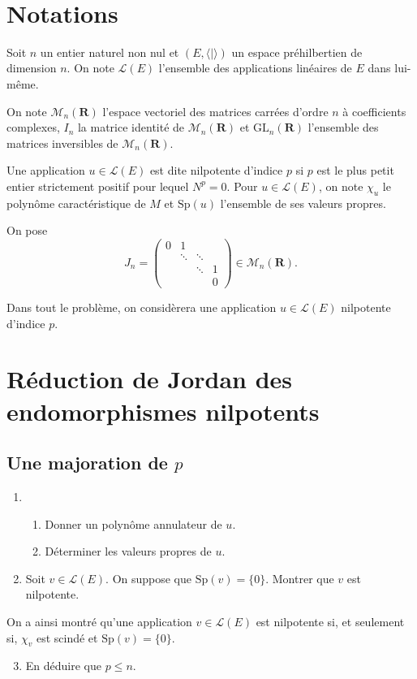 \documentclass[a4paper,11pt]{article}
\newcommand{\R}{\mathbf{R}}
\newcommand{\M}{\mathcal{M}}
\renewcommand{\L}{\mathcal{L}}
\newcommand{\titre}[1]{
		\colorbox{vert1}{
		\parbox{\headwidth}{
			\center{\Large{\sffamily\bfseries{\color{gris}{#1}}}}\\
			\vspace*{1em}
		}}
	}
\begin{document}
\thispagestyle{empty}	%
\pagecolor{gris}			%
\titre{Autour des endomorphismes nilpotents}
\vspace*{1em}
\section*{Notations}
Soit $n$ un entier naturel non nul et $(E,\langle\vert\rangle)$ un espace préhilbertien de dimension $n$. On note $\L(E)$ l'ensemble des applications linéaires de $E$ dans lui-même.

On note $\M_n(\R)$ l'espace vectoriel des matrices carrées d'ordre $n$ à coefficients complexes, $I_n$ la matrice identité de $\M_n(\R)$ et $\mathrm{GL}_n(\R)$ l'ensemble des matrices inversibles de $\M_n(\R)$.

Une application $u\in\L(E)$ est dite nilpotente d'indice $p$ si $p$ est le plus petit entier strictement positif pour lequel $N^p=0$. Pour $u\in\L(E)$, on note $\chi_u$ le polynôme caractéristique de $M$ et $\mathrm{Sp}(u)$ l'ensemble de ses valeurs propres.

On pose \[J_n=\begin{pmatrix}
0&1&&\\
&\ddots&\ddots&\\
&&\ddots&1\\
&&&0

\end{pmatrix}\in\M_n(\R).\]

Dans tout le problème, on considèrera une application $u\in\L(E)$ nilpotente d'indice $p$.

\section{Réduction de Jordan des endomorphismes nilpotents}
	\subsection{Une majoration de $p$}
	\begin{enumerate}
	\item
	\begin{enumerate}
		\item Donner un polynôme annulateur de $u$.
		\item Déterminer les valeurs propres de $u$.
	\end{enumerate}
	\item Soit $v\in\L(E)$. On suppose que $\mathrm{Sp}(v)=\{0\}$. Montrer que $v$ est nilpotente.
	\end{enumerate}
	On a ainsi montré qu'une application $v\in\L(E)$ est nilpotente si, et seulement si, $\chi_v$ est scindé et $\mathrm{Sp}(v)=\{0\}$.
	\begin{enumerate}
	\setcounter{enumi}{2}
	\item En déduire que $p\leq n$.
	\end{enumerate}
\end{document}
